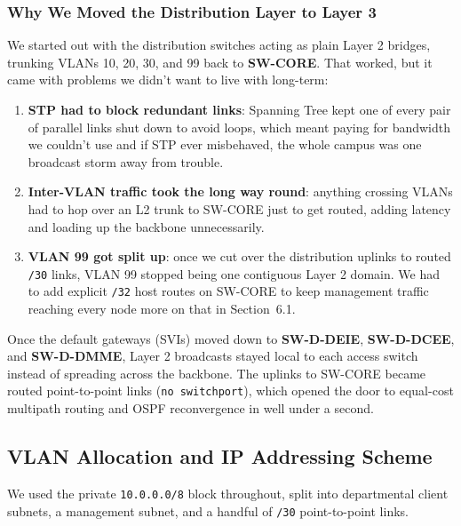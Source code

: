 \documentclass[11pt,a4paper]{article}
\begin{document}
\subsubsection{Why We Moved the Distribution Layer to Layer 3}
We started out with the distribution switches acting as plain Layer 2 bridges, trunking VLANs 10, 20, 30, and 99 back to \textbf{SW-CORE}. That worked, but it came with problems we didn't want to live with long-term:
\begin{enumerate}
    \item \textbf{STP had to block redundant links}: Spanning Tree kept one of every pair of parallel links shut down to avoid loops, which meant paying for bandwidth we couldn't use and if STP ever misbehaved, the whole campus was one broadcast storm away from trouble.
    \item \textbf{Inter-VLAN traffic took the long way round}: anything crossing VLANs had to hop over an L2 trunk to SW-CORE just to get routed, adding latency and loading up the backbone unnecessarily.
    \item \textbf{VLAN 99 got split up}: once we cut over the distribution uplinks to routed \texttt{/30} links, VLAN 99 stopped being one contiguous Layer 2 domain. We had to add explicit \texttt{/32} host routes on SW-CORE to keep management traffic reaching every node more on that in Section~6.1.
\end{enumerate}

Once the default gateways (SVIs) moved down to \textbf{SW-D-DEIE}, \textbf{SW-D-DCEE}, and \textbf{SW-D-DMME}, Layer 2 broadcasts stayed local to each access switch instead of spreading across the backbone. The uplinks to SW-CORE became routed point-to-point links (\texttt{no switchport}), which opened the door to equal-cost multipath routing and OSPF reconvergence in well under a second.

\subsection{VLAN Allocation and IP Addressing Scheme}

We used the private \texttt{10.0.0.0/8} block throughout, split into departmental client subnets, a management subnet, and a handful of \texttt{/30} point-to-point links.
\end{document}
